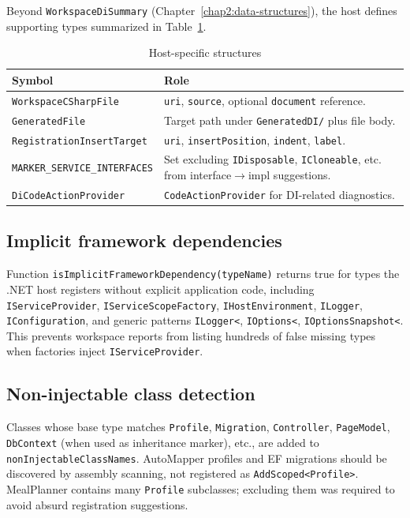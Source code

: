 Beyond \texttt{WorkspaceDiSummary} (Chapter~\ref{chap2:data-structures}), the host defines supporting types summarized in Table~\ref{tab:host-types}.

\begin{table}[htbp]
\centering
\caption{Host-specific structures}
\label{tab:host-types}
\begin{tabular}{|l|p{8.5cm}|}
\hline
\textbf{Symbol} & \textbf{Role} \\
\hline
\texttt{WorkspaceCSharpFile} & \texttt{uri}, \texttt{source}, optional \texttt{document} reference. \\
\hline
\texttt{GeneratedFile} & Target path under \texttt{GeneratedDI/} plus file body. \\
\hline
\texttt{RegistrationInsertTarget} & \texttt{uri}, \texttt{insertPosition}, \texttt{indent}, \texttt{label}. \\
\hline
\texttt{MARKER\_SERVICE\_INTERFACES} & Set excluding \texttt{IDisposable}, \texttt{ICloneable}, etc. from interface$\rightarrow$impl suggestions. \\
\hline
\texttt{DiCodeActionProvider} & \texttt{CodeActionProvider} for DI-related diagnostics. \\
\hline
\end{tabular}
\end{table}

\subsection{Implicit framework dependencies}

Function \texttt{isImplicitFrameworkDependency(typeName)} returns true for types the .NET host registers without explicit application code, including \texttt{IServiceProvider}, \texttt{IServiceScopeFactory}, \texttt{IHostEnvironment}, \texttt{ILogger}, \texttt{IConfiguration}, and generic patterns \texttt{ILogger<}, \texttt{IOptions<}, \texttt{IOptionsSnapshot<}. This prevents workspace reports from listing hundreds of false missing types when factories inject \texttt{IServiceProvider}.

\subsection{Non-injectable class detection}

Classes whose base type matches \texttt{Profile}, \texttt{Migration}, \texttt{Controller}, \texttt{PageModel}, \texttt{DbContext} (when used as inheritance marker), etc., are added to \texttt{nonInjectableClassNames}. AutoMapper profiles and EF migrations should be discovered by assembly scanning, not registered as \texttt{AddScoped<Profile>}. MealPlanner contains many \texttt{Profile} subclasses; excluding them was required to avoid absurd registration suggestions.

